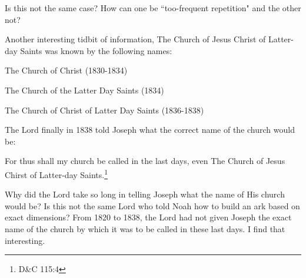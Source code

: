 Is this not the same case? How can one be ``too-frequent repetition" and the other 
not?

Another interesting tidbit of information, The Church of Jesus Christ of Latter-day
Saints was known by the following names:

The Church of Christ (1830-1834)

The Church of the Latter Day Saints (1834)

The Church of Christ of Latter Day Saints (1836-1838)

The Lord finally in 1838 told Joseph what the correct name of the church would be:

\begin{displayquote}
For thus shall my church be called in the last days, even The Church of Jesus Chirst
of Latter-day Saints.\footnote{D\&C 115:4}
\end{displayquote}

Why did the Lord take so long in telling Joseph what the name of His church would be?
Is this not the same Lord who told Noah how to build an ark based on exact
dimensions? From 1820 to 1838, the Lord had not given Joseph the exact name of the
church by which it was to be called in these last days. I find that interesting.